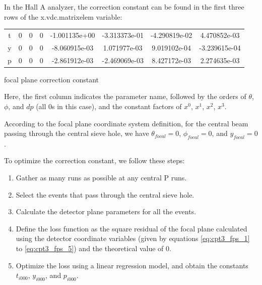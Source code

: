 In the Hall A analyzer, the correction constant can be found in the first three rows of the x.vdc.matrixelem variable:

\begin{center}
    \begin{tabular}{|c c c c | c c c c|} \hline
        t & 0 & 0 & 0 & -1.001135e+00 & -3.313373e-01 & -4.290819e-02 & 4.470852e-03 \\
        y & 0 & 0 & 0 & -8.060915e-03 & 1.071977e-03 & 9.019102e-04 & -3.239615e-04 \\
        p & 0 & 0 & 0 & -2.861912e-03 & -2.469069e-03 & 8.427172e-03 & 2.274635e-03 \\ \hline
    \end{tabular}
    \caption{focal plane correction constant}
\end{center}

Here, the first column indicates the parameter name, followed by the orders of $\theta$, $\phi$, and $dp$ (all 0s in this case), and the constant factors of $x^0$, $x^1$, $x^2$, $x^3$.

According to the focal plane coordinate system definition, for the central beam passing through the central sieve hole, we have $\theta_{focal}=0$, $\phi_{focal}=0$, and $y_{focal}=0$.

To optimize the correction constant, we follow these steps:

\begin{enumerate}
    \item Gather as many runs as possible at any central P runs.
    \item Select the events that pass through the central sieve hole.
    \item Calculate the detector plane parameters for all the events.
    \item Define the loss function as the square residual of the focal plane calculated using the detector coordinate variables (given by equations \ref{eq:cpt3_fps_1} to \ref{eq:cpt3_fps_5}) and the theoretical value of 0.
    \item Optimize the loss using a linear regression model, and obtain the constants $t_{i000}$, $y_{i000}$, and $p_{i000}$.
\end{enumerate}



